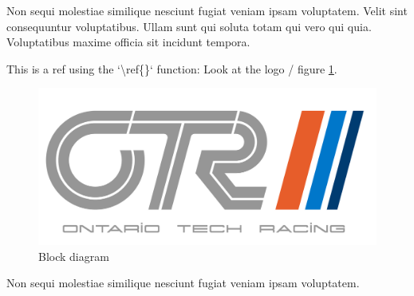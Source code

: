 

Non sequi molestiae similique nesciunt fugiat veniam ipsam voluptatem. Velit sint consequuntur voluptatibus. Ullam sunt qui soluta totam qui vero qui quia. Voluptatibus maxime officia sit incidunt tempora.

This is a ref using the `\textbackslash ref\{\}` function: Look at the logo / figure \ref{fig_block_diagram}.

\begin{figure}[H]
\centering
\includegraphics[width=1\textwidth]{figures/otrLogo_greyOnWhite.png}
\caption{Block diagram}
\label{fig_block_diagram}
\end{figure}

Non sequi molestiae similique nesciunt fugiat veniam ipsam voluptatem.
